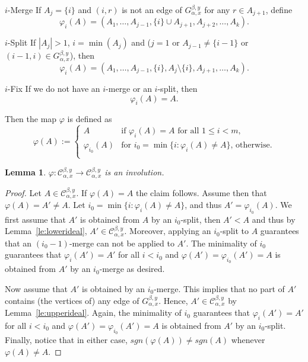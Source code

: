 \documentclass[10pt]{amsart}
\newtheorem{lemma}[theorem]{Lemma}
\theoremstyle{definition}
\newenvironment{enonce*}[2][]{\par\smallskip\noindent\textbf{#2}.\par\nobreak}{\par\smallskip}
\begin{document}
\begin{enonce*}{$i$-Merge} If $A_j=\{i\}$ and $(i,r)$ is not an edge of $G_{\alpha,x}^{\beta,y}$ for any $r\in A_{j+1}$, 
define
 $$ \varphi_i(A)=(A_1,\ldots,A_{j-1},\{i\}\cup A_{j+1},A_{j+2},\ldots, A_k).$$
\end{enonce*}


\begin{enonce*}{$i$-Split} If $|A_j|>1$, $i=\min(A_j)$ and \big($j=1$ or $A_{j-1}\ne\{i-1\}$ or $(i-1,i)\in G_{\alpha,x}^{\beta,y}$\big), then
 $$ \varphi_i(A)=(A_1,\ldots,A_{j-1},\{i\},A_{j}\setminus\{i\},A_{j+1},\ldots, A_k).$$
\end{enonce*}
 
\begin{enonce*}{$i$-Fix} If we do not have an $i$-merge or an $i$-split, then
 $$\varphi_i(A)=A.$$
\end{enonce*}
 
 Then the map $\varphi$ is defined as
 \begin{equation}\label{eq:involution}
 \varphi(A):=\begin{cases}
 A & \text{if $\varphi_i(A)=A$ for all $1\le i<m$,}\\
 \varphi_{i_0}(A) & \text{for $i_0=\min\big\{i:\varphi_i(A)\ne A\big\}$, otherwise.}\\
 \end{cases}
 \end{equation}

\begin{lemma}\label{le:involution}
 $\varphi\colon \mathcal{C}_{\alpha,x}^{\beta,y} \to \mathcal{C}_{\alpha,x}^{\beta,y}$ is an involution.
\end{lemma}
 
\begin{proof} Let $A\in \mathcal{C}_{\alpha,x}^{\beta,y}$. If $\varphi(A)=A$ the claim follows. Assume then that $\varphi(A)=A'\ne A$. Let $i_0=\min\big\{i:\varphi_i(A)\ne A\big\}$, and thus $A'= \varphi_{i_0}(A)$. We first assume that $A'$ is obtained from $A$ by an $i_0$-split, then $A'<A$ and thus by Lemma~\ref{le:lowerideal}, $A' \in \mathcal{C}_{\alpha,x}^{\beta,y}$. Moreover, applying an $i_0$-split to $A$ guarantees that an $(i_0-1)$-merge can not be applied to $A'$. The minimality of $i_0$ guarantees that $\varphi_i(A')=A'$ for all $i<i_0$ and $\varphi(A')=\varphi_{i_0}(A')=A$ is obtained from $A'$ by an $i_0$-merge as desired.

Now assume that $A'$ is obtained by an $i_0$-merge. This implies that no part of $A'$ contains (the vertices of) any edge of $G_{\alpha,x}^{\beta,y}$. Hence, $A' \in \mathcal{C}_{\alpha,x}^{\beta,y}$ by Lemma~\ref{le:upperideal}. Again, the minimality of $i_0$ guarantees that $\varphi_i(A')=A'$ for all $i<i_0$ and $\varphi(A')=\varphi_{i_0}(A')=A$ is obtained from $A'$ by an $i_0$-split. Finally, notice that in either case, $sgn( \varphi(A))\neq sgn(A)$ whenever $ \varphi(A)\neq A$.
\end{proof}
\end{document}
